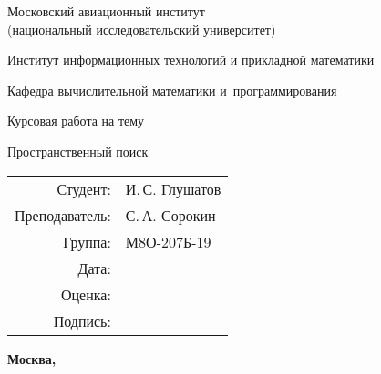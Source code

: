 \begin{titlepage}
\begin{center}
\bfseries

{\Large Московский авиационный институт\\ (национальный исследовательский университет)

}

\vspace{48pt}

{\large Институт информационных технологий и прикладной математики
}

\vspace{36pt}

{\large Кафедра вычислительной математики и~программирования

}


\vspace{128pt}

{\large Курсовая работа на тему
}
\vspace{20pt}

{\Large Пространственный поиск
}
\end{center}

\vspace{240pt}

\begin{flushright}
\begin{tabular}{rl}
Студент: & И.\,С. Глушатов \\
Преподаватель: & С.\,А. Сорокин \\
Группа: & М8О-207Б-19 \\
Дата: & \\
Оценка: & \\
Подпись: & \\
\end{tabular}
\end{flushright}

\vfill

\begin{center}
\bfseries
Москва, \the\year
\end{center}
\end{titlepage}

\pagebreak
